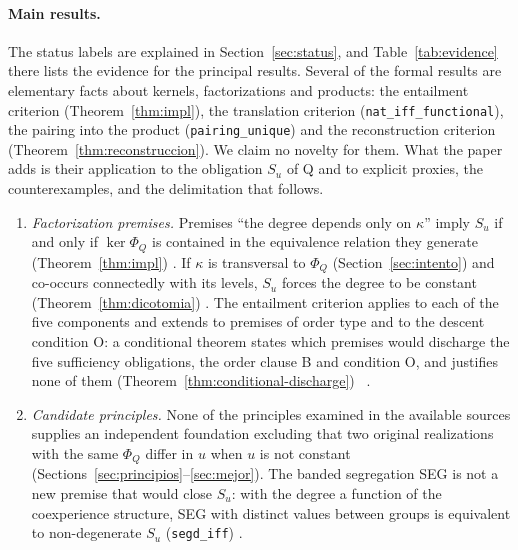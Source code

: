 \paragraph{Main results.} The status labels are explained in Section~\ref{sec:status}, and Table~\ref{tab:evidence} there lists the evidence for the principal results. Several of the formal results are elementary facts about kernels, factorizations and products: the entailment criterion (Theorem~\ref{thm:impl}), the translation criterion (\texttt{nat\_iff\_functional}), the pairing into the product (\texttt{pairing\_unique}) and the reconstruction criterion (Theorem~\ref{thm:reconstruccion}). We claim no novelty for them. What the paper adds is their application to the obligation $S_u$ of Q and to explicit proxies, the counterexamples, and the delimitation that follows.
\begin{enumerate}
\item[(R1)] \emph{Factorization premises.} Premises ``the degree depends only on $\kappa$'' imply $S_u$ if and only if $\ker\Phi_Q$ is contained in the equivalence relation they generate (Theorem~\ref{thm:impl}) \stL. If $\kappa$ is transversal to $\Phi_Q$ (Section~\ref{sec:intento}) and co-occurs connectedly with its levels, $S_u$ forces the degree to be constant (Theorem~\ref{thm:dicotomia}) \stL. The entailment criterion applies to each of the five components and extends to premises of order type and to the descent condition O: a conditional theorem states which premises would discharge the five sufficiency obligations, the order clause B and condition O, and justifies none of them (Theorem~\ref{thm:conditional-discharge}) \stA\ \stL.
\item[(R2)] \emph{Candidate principles.} None of the principles examined in the available sources supplies an independent foundation excluding that two original realizations with the same $\Phi_Q$ differ in $u$ when $u$ is not constant (Sections~\ref{sec:principios}--\ref{sec:mejor}). The banded segregation SEG is not a new premise that would close $S_u$: with the degree a function of the coexperience structure, SEG with distinct values between groups is equivalent to non-degenerate $S_u$ (\texttt{segd\_iff}) \stL.

\end{enumerate}
